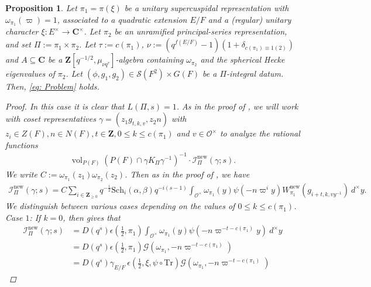 \documentclass{amsart}
\theoremstyle{plain}
\newtheorem{prop}[thm]{Proposition}
\theoremstyle{plain}
\theoremstyle{remark}
\DeclareMathOperator{\vol}{vol}
\begin{document}
\begin{prop}\label{thm sup. x unr. p-s}
    Let $\pi_1=\pi(\xi)$ be a unitary supercuspidal representation with $\omega_{\pi_1}(\varpi)=1$, associated to a quadratic extension $E/F$ and a (regular) unitary character $\xi:E^\times\rightarrow\mathbf{C}^\times$. Let $\pi_2$ be an unramified principal-series representation, and set $\Pi:=\pi_1\times\pi_2$. Let $\tau:=c(\pi_1)$, $\nu:=(q^{f(E/F)}-1)(1+\delta_{c(\pi_1)\equiv 1(2)})$ and $A\subseteq\mathbf{C}$ be a $\mathbf{Z}[q^{-1/2},\mu_{\nu q^\tau}]$-algebra containing $\omega_{\pi_2}$ and the spherical Hecke eigenvalues of $\pi_2$. Let $(\phi,g_1,g_2)\in\mathcal{S}(F^2)\times G(F)$ be a $\Pi$-integral datum. Then, \eqref{eq: Problem} holds.
    \begin{proof}
        In this case it is clear that $L(\Pi,s)=1$. As in the proof of , we will work with coset representatives $\gamma=(z_1g_{t,k,v},z_2n)$ with $z_i\in Z(F), n\in N(F), t\in \mathbf{Z}, 0\leq k\leq c(\pi_1)$ and $v\in\mathcal{O}^\times$ to analyze the rational functions
        \begin{align}\label{eq: 31} \vol_{P(F)}(P(F)\cap\gamma K_\Pi\gamma^{-1})^{-1}\cdot\mathcal{I}_{\Pi}^\mathrm{new}(\gamma;s).\end{align}
        We write $C:=\omega_{\pi_1}(z_1)\omega_{\pi_2}(z_2)$. Then as in the proof of , we have
        \begin{align}\label{eq: 32}
            \mathcal{I}_{\Pi}^\mathrm{new}(\gamma ;s)=C \sum_{i\in\mathbf{Z}_{\geq 0}}q^{-\tfrac{i}{2}}\mathrm{Sch}_i(\alpha,\beta)q^{-i(s-1)}\int_{\mathcal{O}^\times}\omega_{\pi_1}(y)\psi(-n\varpi^iy)W_{\pi_1}^\mathrm{new}(g_{i+t,k,vy^{-1}})\ d^\times y.
        \end{align}
        We distinguish between various cases depending on the values of $0\leq k\leq c(\pi_1)$.\\
        \textit{Case} $1$: If $k=0$, then  gives that
        \begin{align*}
             \mathcal{I}_{\Pi}^\mathrm{new}(\gamma;s)&=D(q^s) \epsilon(\tfrac{1}{2},\pi_1)\int_{\mathcal{O}^\times}\omega_{\pi_1}(y)\psi(-n\varpi^{-t-c(\pi_1)}y)\ d^\times y\\
             &=D(q^s) \epsilon(\tfrac{1}{2},\pi_1)\mathscr{G}(\omega_{\pi_1},-n\varpi^{-t-c(\pi_1)})\\
             &=D(q^s)\gamma_{E/F}\ \epsilon(\tfrac{1}{2},\xi,\psi\circ\mathrm{Tr})\mathscr{G}(\omega_{\pi_1},-n\varpi^{-t-c(\pi_1)})

\end{align*}
\end{proof}
\end{prop}
\end{document}
